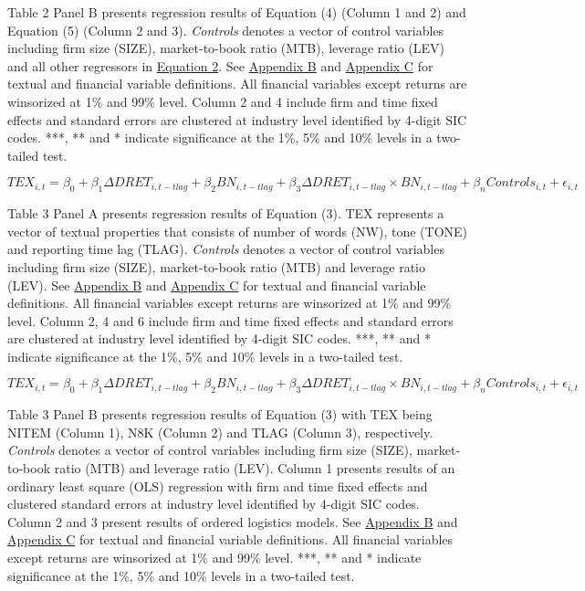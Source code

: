Table 2 Panel B presents regression results of Equation (4) (Column 1 and 2) and Equation (5) (Column 2 and 3). \textit{Controls} denotes a vector of control variables including firm size (SIZE), market-to-book ratio (MTB), leverage ratio (LEV) and all other regressors in \hyperref[eq2]{Equation 2}. See \hyperref[appb]{Appendix B} and \hyperref[appc]{Appendix C} for textual and financial variable definitions. All financial variables except returns are winsorized at 1\% and 99\% level. Column 2 and 4 include firm and time fixed effects and standard errors are clustered at industry level identified by 4-digit SIC codes. ***, ** and * indicate significance at the 1\%, 5\% and 10\% levels in a two-tailed test.

\newpage

\setcounter{equation}{2}
\begin{equation}
TEX_{i,t}=\beta_0+\beta_1\Delta DRET_{i,t-tlag}+\beta_2BN_{i,t-tlag}+\beta_3\Delta DRET_{i,t-tlag}\times BN_{i,t-tlag}+\beta_nControls_{i,t}+\epsilon_{i,t}
\end{equation}

Table 3 Panel A presents regression results of Equation (3). TEX represents a vector of textual properties that consists of number of words (NW), tone (TONE) and reporting time lag (TLAG). \textit{Controls} denotes a vector of control variables including firm size (SIZE), market-to-book ratio (MTB) and leverage ratio (LEV). See \hyperref[appb]{Appendix B} and \hyperref[appc]{Appendix C} for textual and financial variable definitions. All financial variables except returns are winsorized at 1\% and 99\% level. Column 2, 4 and 6 include firm and time fixed effects and standard errors are clustered at industry level identified by 4-digit SIC codes. ***, ** and * indicate significance at the 1\%, 5\% and 10\% levels in a two-tailed test.

\newpage

\setcounter{equation}{2}
\begin{equation}
TEX_{i,t}=\beta_0+\beta_1\Delta DRET_{i,t-tlag}+\beta_2BN_{i,t-tlag}+\beta_3\Delta DRET_{i,t-tlag}\times BN_{i,t-tlag}+\beta_nControls_{i,t}+\epsilon_{i,t}
\end{equation}

Table 3 Panel B presents regression results of Equation (3) with TEX being NITEM (Column 1), N8K (Column 2) and TLAG (Column 3), respectively. \textit{Controls} denotes a vector of control variables including firm size (SIZE), market-to-book ratio (MTB) and leverage ratio (LEV). Column 1 presents results of an ordinary least square (OLS) regression with firm and time fixed effects and clustered standard errors at industry level identified by 4-digit SIC codes. Column 2 and 3 present results of ordered logistics models. See \hyperref[appb]{Appendix B} and \hyperref[appc]{Appendix C} for textual and financial variable definitions. All financial variables except returns are winsorized at 1\% and 99\% level. ***, ** and * indicate significance at the 1\%, 5\% and 10\% levels in a two-tailed test.